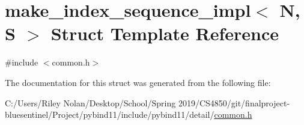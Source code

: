\hypertarget{structmake__index__sequence__impl}{}\section{make\+\_\+index\+\_\+sequence\+\_\+impl$<$ N, S $>$ Struct Template Reference}
\label{structmake__index__sequence__impl}


{\ttfamily \#include $<$common.\+h$>$}



The documentation for this struct was generated from the following file\+:\begin{DoxyCompactItemize}
\item 
C\+:/\+Users/\+Riley Nolan/\+Desktop/\+School/\+Spring 2019/\+C\+S4850/git/finalproject-\/bluesentinel/\+Project/pybind11/include/pybind11/detail/\mbox{\hyperlink{detail_2common_8h}{common.\+h}}\end{DoxyCompactItemize}
